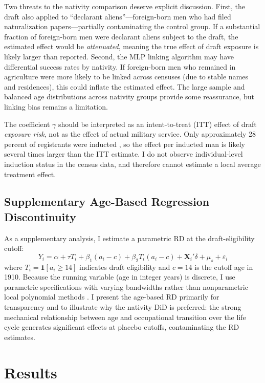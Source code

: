 \documentclass[12pt]{article}
\begin{document}
Two threats to the nativity comparison deserve explicit discussion. First, the draft also applied to ``declarant aliens''---foreign-born men who had filed naturalization papers---partially contaminating the control group. If a substantial fraction of foreign-born men were declarant aliens subject to the draft, the estimated effect would be \textit{attenuated}, meaning the true effect of draft exposure is likely larger than reported. Second, the MLP linking algorithm may have differential success rates by nativity. If foreign-born men who remained in agriculture were more likely to be linked across censuses (due to stable names and residences), this could inflate the estimated effect. The large sample and balanced age distributions across nativity groups provide some reassurance, but linking bias remains a limitation.

The coefficient $\gamma$ should be interpreted as an intent-to-treat (ITT) effect of draft \textit{exposure risk}, not as the effect of actual military service. Only approximately 28 percent of registrants were inducted \citep{kennedy2004}, so the effect per inducted man is likely several times larger than the ITT estimate. I do not observe individual-level induction status in the census data, and therefore cannot estimate a local average treatment effect.

\subsection{Supplementary Age-Based Regression Discontinuity}

As a supplementary analysis, I estimate a parametric RD at the draft-eligibility cutoff:
\begin{equation}
Y_i = \alpha + \tau T_i + \beta_1 (a_i - c) + \beta_2 T_i(a_i - c) + \mathbf{X}_i'\delta + \mu_s + \varepsilon_i
\label{eq:rd}
\end{equation}
where $T_i = \mathbf{1}[a_i \geq 14]$ indicates draft eligibility and $c = 14$ is the cutoff age in 1910. Because the running variable (age in integer years) is discrete, I use parametric specifications with varying bandwidths rather than nonparametric local polynomial methods \citep{lee2009, imbens2008}. I present the age-based RD primarily for transparency and to illustrate why the nativity DiD is preferred: the strong mechanical relationship between age and occupational transition over the life cycle generates significant effects at placebo cutoffs, contaminating the RD estimates.

\section{Results}
\end{document}
